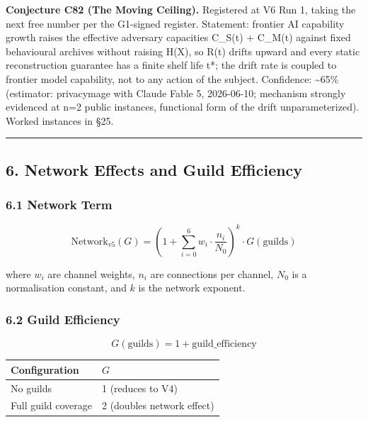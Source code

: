 \documentclass[
  11pt,
]{article}
\newcounter{none} %
\begin{document}
\textbf{Conjecture C82 (The Moving Ceiling).} Registered at V6 Run 1,
taking the next free number per the G1-signed register. Statement:
frontier AI capability growth raises the effective adversary capacities
C\_S(t) + C\_M(t) against fixed behavioural archives without raising
H(X), so R(t) drifts upward and every static reconstruction guarantee
has a finite shelf life t*; the drift rate is coupled to frontier model
capability, not to any action of the subject. Confidence:
\textasciitilde65\% (estimator: privacymage with Claude Fable 5,
2026-06-10; mechanism strongly evidenced at n=2 public instances,
functional form of the drift unparameterized). Worked instances in §25.

\begin{center}\rule{0.5\linewidth}{0.5pt}\end{center}

\subsection{6. Network Effects and Guild
Efficiency}\label{network-effects-and-guild-efficiency}

\subsubsection{6.1 Network Term}\label{network-term}

\[\text{Network}_{v5}(G) = \left(1 + \sum_{i=0}^{6} w_i \cdot \frac{n_i}{N_0}\right)^k \cdot G(\text{guilds})\]

where \(w_i\) are channel weights, \(n_i\) are connections per channel,
\(N_0\) is a normalisation constant, and \(k\) is the network exponent.

\subsubsection{6.2 Guild Efficiency}\label{guild-efficiency}

\[G(\text{guilds}) = 1 + \text{guild\_efficiency}\]

{\def\LTcaptype{none} %
\begin{longtable}[]{@{}ll@{}}
\toprule\noalign{}
Configuration & \(G\) \\
\midrule\noalign{}
\endhead
\bottomrule\noalign{}
\endlastfoot
No guilds & 1 (reduces to V4) \\
Full guild coverage & 2 (doubles network effect) \\
\end{longtable}
}
\end{document}
